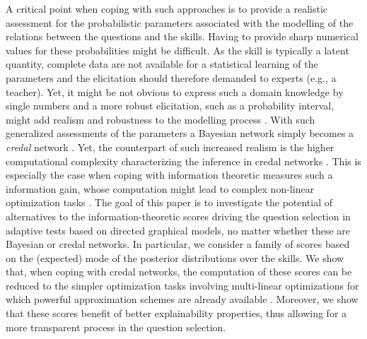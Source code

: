 \documentclass[runningheads]{llncs}
\begin{document}
A critical point when coping with such approaches is to provide a realistic assessment for the probabilistic parameters associated with the modelling of the relations between the questions and the skills. Having to provide sharp numerical values for these probabilities might be difficult. As the skill is typically a latent quantity, complete data are not available for a statistical learning of the parameters and the elicitation should therefore demanded to experts (e.g., a teacher). Yet, it might be not obvious to express such a domain knowledge by single numbers and a more robust elicitation, such as a probability interval, might add realism and robustness to the modelling process \cite{hajek2012rationality}. With such generalized assessments of the parameters a Bayesian network simply becomes a \emph{credal} network \cite{antonucci2010d}. Yet, the counterpart of such increased realism is the higher computational complexity characterizing the inference in credal networks \cite{maua14jair}. This is especially the case when coping with information theoretic measures such a information gain, whose computation might lead to complex non-linear optimization tasks \cite{mangili2017b}. The goal of this paper is to investigate the potential of alternatives to the information-theoretic scores driving the question selection in adaptive tests based on directed graphical models, no matter whether these are Bayesian or credal networks. In particular, we consider a family of scores based on the (expected) mode of the posterior distributions over the skills. We show that, when coping with credal networks, the computation of these scores can be reduced to the simpler optimization tasks involving multi-linear optimizations for which powerful approximation schemes are already available \cite{antonucci2013a}. Moreover, we show that these scores benefit of better explainability properties, thus allowing for a more transparent process in the question selection.
\end{document}
